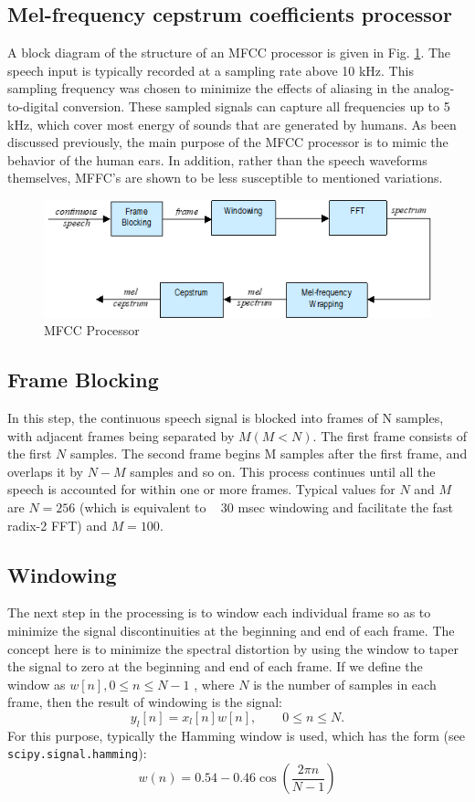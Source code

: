 \documentclass{article}
\begin{document}
\subsection{Mel-frequency cepstrum coefficients processor}
A block diagram of the structure of an MFCC processor is given in Fig. \ref{fig:mfcc}. The speech input is typically recorded at a sampling rate above 10 kHz.  This sampling frequency was chosen to minimize the effects of aliasing in the analog-to-digital conversion.  These sampled signals can capture all frequencies up to 5 kHz, which cover most energy of sounds that are generated by humans.  As been discussed previously, the main purpose of the MFCC processor is to mimic the behavior of the human ears.  In addition, rather than the speech waveforms themselves, MFFC's are shown to be less susceptible to mentioned variations.

\begin{figure}
    \centering
    \includegraphics[width=.8\textwidth]{Picture1.png}
    \caption{MFCC Processor}
    \label{fig:mfcc}
\end{figure}

\subsection{Frame Blocking}
In this step, the continuous speech signal is blocked into frames of N  samples, with adjacent frames being separated by $M (M < N)$.  The first frame consists of the first $N$ samples.  The second frame begins M samples after the first frame, and overlaps it by $N - M$ samples and so on.  This process continues until all the speech is accounted for within one or more frames.  Typical values for $N$ and $M$ are $N = 256$ (which is equivalent to ~ 30 msec windowing and facilitate the fast radix-2 FFT) and $M = 100$.

\subsection{Windowing}
The next step in the processing is to window each individual frame so as to minimize the signal discontinuities at the beginning and end of each frame.  The concept here is to minimize the spectral distortion by using the window to taper the signal to zero at the beginning and end of each frame.  If we define the window as $w[n], 0\leq n\leq N-1$ , where $N$ is the number of samples in each frame, then the result of windowing is the signal:
\begin{equation}
    y_l[n] =x_l[n]w[n], \qquad 0\leq n \leq N.
\end{equation}
For this purpose, typically the Hamming window is used, which has the form (see \texttt{scipy.signal.hamming}):
\begin{equation}
    w(n) = 0.54 - 0.46 \cos\left(\frac{2\pi n}{N-1}\right)
\end{equation}
\end{document}
